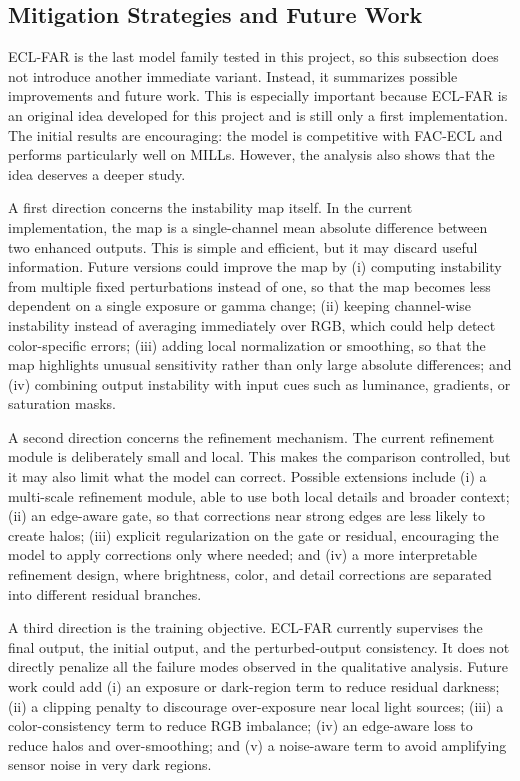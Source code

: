 \subsection{Mitigation Strategies and Future Work}

ECL-FAR is the last model family tested in this project, so this subsection does not introduce another immediate variant. Instead, it summarizes possible improvements and future work. This is especially important because ECL-FAR is an original idea developed for this project and is still only a first implementation. The initial results are encouraging: the model is competitive with FAC-ECL and performs particularly well on MILLs. However, the analysis also shows that the idea deserves a deeper study.

A first direction concerns the instability map itself. In the current implementation, the map is a single-channel mean absolute difference between two enhanced outputs. This is simple and efficient, but it may discard useful information. Future versions could improve the map by (i) computing instability from multiple fixed perturbations instead of one, so that the map becomes less dependent on a single exposure or gamma change; (ii) keeping channel-wise instability instead of averaging immediately over RGB, which could help detect color-specific errors; (iii) adding local normalization or smoothing, so that the map highlights unusual sensitivity rather than only large absolute differences; and (iv) combining output instability with input cues such as luminance, gradients, or saturation masks.

A second direction concerns the refinement mechanism. The current refinement module is deliberately small and local. This makes the comparison controlled, but it may also limit what the model can correct. Possible extensions include (i) a multi-scale refinement module, able to use both local details and broader context; (ii) an edge-aware gate, so that corrections near strong edges are less likely to create halos; (iii) explicit regularization on the gate or residual, encouraging the model to apply corrections only where needed; and (iv) a more interpretable refinement design, where brightness, color, and detail corrections are separated into different residual branches.

A third direction is the training objective. ECL-FAR currently supervises the final output, the initial output, and the perturbed-output consistency. It does not directly penalize all the failure modes observed in the qualitative analysis. Future work could add (i) an exposure or dark-region term to reduce residual darkness; (ii) a clipping penalty to discourage over-exposure near local light sources; (iii) a color-consistency term to reduce RGB imbalance; (iv) an edge-aware loss to reduce halos and over-smoothing; and (v) a noise-aware term to avoid amplifying sensor noise in very dark regions.

